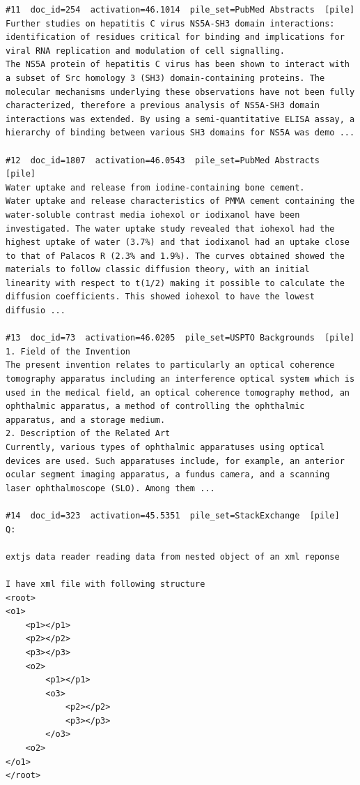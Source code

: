\begin{verbatim}
#11  doc_id=254  activation=46.1014  pile_set=PubMed Abstracts  [pile]
Further studies on hepatitis C virus NS5A-SH3 domain interactions: identification of residues critical for binding and implications for viral RNA replication and modulation of cell signalling.
The NS5A protein of hepatitis C virus has been shown to interact with a subset of Src homology 3 (SH3) domain-containing proteins. The molecular mechanisms underlying these observations have not been fully characterized, therefore a previous analysis of NS5A-SH3 domain interactions was extended. By using a semi-quantitative ELISA assay, a hierarchy of binding between various SH3 domains for NS5A was demo ...

#12  doc_id=1807  activation=46.0543  pile_set=PubMed Abstracts  [pile]
Water uptake and release from iodine-containing bone cement.
Water uptake and release characteristics of PMMA cement containing the water-soluble contrast media iohexol or iodixanol have been investigated. The water uptake study revealed that iohexol had the highest uptake of water (3.7%) and that iodixanol had an uptake close to that of Palacos R (2.3% and 1.9%). The curves obtained showed the materials to follow classic diffusion theory, with an initial linearity with respect to t(1/2) making it possible to calculate the diffusion coefficients. This showed iohexol to have the lowest diffusio ...

#13  doc_id=73  activation=46.0205  pile_set=USPTO Backgrounds  [pile]
1. Field of the Invention
The present invention relates to particularly an optical coherence tomography apparatus including an interference optical system which is used in the medical field, an optical coherence tomography method, an ophthalmic apparatus, a method of controlling the ophthalmic apparatus, and a storage medium.
2. Description of the Related Art
Currently, various types of ophthalmic apparatuses using optical devices are used. Such apparatuses include, for example, an anterior ocular segment imaging apparatus, a fundus camera, and a scanning laser ophthalmoscope (SLO). Among them ...

#14  doc_id=323  activation=45.5351  pile_set=StackExchange  [pile]
Q:

extjs data reader reading data from nested object of an xml reponse

I have xml file with following structure
<root>
<o1>
    <p1></p1>
    <p2></p2>
    <p3></p3>
    <o2>
        <p1></p1>
        <o3>
            <p2></p2>
            <p3></p3>
        </o3>
    <o2>
</o1>
</root>


\end{verbatim}
